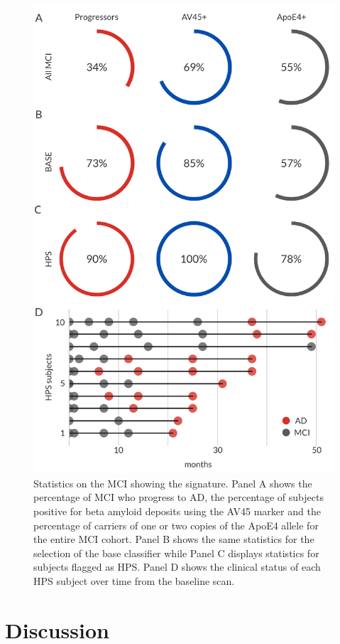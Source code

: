 \documentclass[authoryear]{elsarticle}
\begin{document}
\begin{figure}[htbp]
\centering
\includegraphics[width=0.6\linewidth]{figures/progressors.png}
\caption{Statistics on the MCI showing the signature. Panel A shows the percentage of MCI who progress to AD, the percentage of subjects positive for beta amyloid deposits using the AV45 marker and the percentage of carriers of one or two copies of the ApoE4 allele for the entire MCI cohort. Panel B shows the same statistics for the selection of the base classifier while Panel C displays statistics for subjects flagged as HPS. Panel D shows the clinical status of each HPS subject over time from the baseline scan.}
\label{fig_progressors}
\end{figure}

\section{Discussion}
\end{document}
